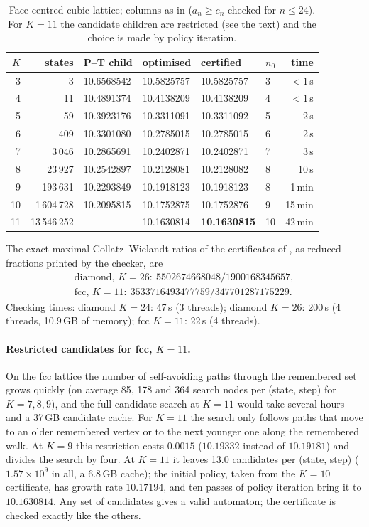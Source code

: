 \documentclass[11pt,a4paper]{report}
\begin{document}
\begin{table}[h]
\centering\small
\caption{Face-centred cubic lattice; columns as in  (\(a_n\ge c_n\) checked for \(n\le24\)). For \(K=11\) the
candidate children are restricted (see the text) and the choice is made by policy iteration.}\label{tab:fcc}
\begin{tabular}{@{}rrllllr@{}}
\toprule
\(K\) & states & P--T child & optimised & certified & \(n_0\) & time \\
\midrule
3 & 3 & 10.6568542 & 10.5825757 & 10.5825757 & 3 & \(<1\)\,s \\
4 & 11 & 10.4891374 & 10.4138209 & 10.4138209 & 4 & \(<1\)\,s \\
5 & 59 & 10.3923176 & 10.3311091 & 10.3311092 & 5 & 2\,s \\
6 & 409 & 10.3301080 & 10.2785015 & 10.2785015 & 6 & 2\,s \\
7 & 3\,046 & 10.2865691 & 10.2402871 & 10.2402871 & 7 & 3\,s \\
8 & 23\,927 & 10.2542897 & 10.2128081 & 10.2128082 & 8 & 10\,s \\
9 & 193\,631 & 10.2293849 & 10.1918123 & 10.1918123 & 8 & 1\,min \\
10 & 1\,604\,728 & 10.2095815 & 10.1752875 & 10.1752876 & 9 & 15\,min \\
11 & 13\,546\,252 & & 10.1630814 & \textbf{10.1630815} & 10 & 42\,min \\
\bottomrule
\end{tabular}
\end{table}

The exact maximal Collatz--Wielandt ratios of the certificates of , as reduced fractions printed by the
checker, are
\begin{gather*}
\text{diamond, }K=26:\ 5502674668048/1900168345657,\\
\text{fcc, }K=11:\ 3533716493477759/347701287175229.
\end{gather*}
Checking times: diamond \(K=24\): 47\,s (3 threads); diamond \(K=26\): 200\,s (4 threads, 10.9\,GB of memory); fcc \(K=11\): 22\,s (4 threads).

\paragraph{Restricted candidates for fcc, \(K=11\).} On the fcc lattice the number of self-avoiding paths through the
remembered set grows quickly (on average 85, 178 and 364 search nodes per (state, step) for \(K=7,8,9\)), and the full
candidate search at \(K=11\) would take several hours and a 37\,GB candidate cache. For \(K=11\) the search only
follows paths that move to an older remembered vertex or to the next younger one along the remembered walk. At
\(K=9\) this restriction costs \(0.0015\) (\(10.19332\) instead of \(10.19181\)) and divides the search by four. At
\(K=11\) it leaves 13.0 candidates per (state, step) (\(1.57\times10^9\) in all, a 6.8\,GB cache); the initial policy,
taken from the \(K=10\) certificate, has growth rate \(10.17194\), and ten passes of policy iteration bring it to
\(10.1630814\). Any set of candidates gives a valid automaton; the certificate is checked exactly like the others.
\end{document}
